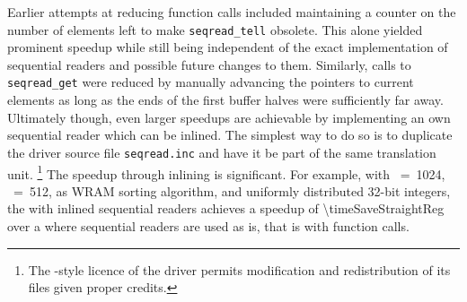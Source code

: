 Earlier attempts at reducing function calls included maintaining a counter on the number of elements left to make \lstinline|seqread_tell| obsolete.
This alone yielded prominent speedup while still being independent of the exact implementation of sequential readers and possible future changes to them.
Similarly, calls to \lstinline|seqread_get| were reduced by manually advancing the pointers to current elements as long as the ends of the first buffer halves were sufficiently far away.
Ultimately though, even larger speedups are achievable by implementing an own sequential reader which can be inlined.
The simplest way to do so is to duplicate the driver source file \lstinline|seqread.inc| and have it be part of the same translation unit.%
\footnote{
	The -style licence of the driver permits modification and redistribution of its files given proper credits.
}
The speedup through inlining is significant.
For example, with \cachesize{}~=~1024, \seqreadcachesize{}~=~512, \QS{} as \ac{WRAM} sorting algorithm, and  uniformly distributed 32-bit integers, the \MS{} with inlined sequential readers achieves a speedup of \num[round-mode=places, round-precision=1]{\timeSaveStraightReg} over a \MS{} where sequential readers are used as is, that is with function calls.

